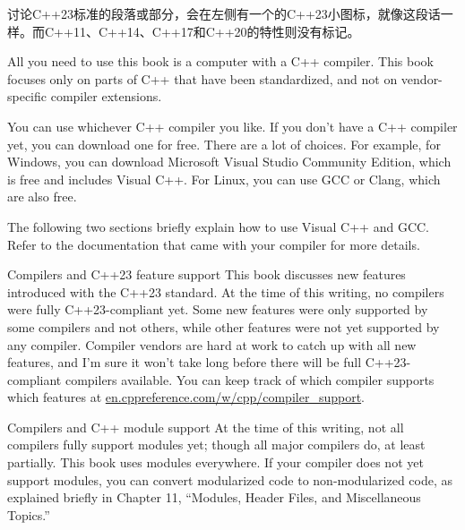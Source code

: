

讨论C++23标准的段落或部分，会在左侧有一个的C++23小图标，就像这段话一样。而C++11、C++14、C++17和C++20的特性则没有标记。



All you need to use this book is a computer with a C++ compiler. This book focuses only on parts of C++ that have been standardized, and not on vendor-specific compiler extensions.


You can use whichever C++ compiler you like. If you don’t have a C++ compiler yet, you can download one for free. There are a lot of choices. For example, for Windows, you can download Microsoft Visual Studio Community Edition, which is free and includes Visual C++. For Linux, you can use GCC or Clang, which are also free.

The following two sections briefly explain how to use Visual C++ and GCC. Refer to the documentation that came with your compiler for more details.

\begin{myTip}{Compilers and C++23 feature support}
This book discusses new features introduced with the C++23 standard. At the time of this writing, no compilers were fully C++23-compliant yet. Some new features were only supported by some compilers and not others, while other features were not yet supported by any compiler. Compiler vendors are hard at work to catch up with all new features, and I’m sure it won’t take long before there will be full C++23-compliant compilers available. You can keep track of which compiler supports which features at \url{en.cppreference.com/w/cpp/compiler_support}.
\end{myTip}

\begin{myTip}{Compilers and C++ module support}
At the time of this writing, not all compilers fully support modules yet; though all major compilers do, at least partially. This book uses modules everywhere. If your compiler does not yet support modules, you can convert modularized code to non-modularized code, as explained briefly in Chapter 11, “Modules, Header Files, and Miscellaneous Topics.”
\end{myTip}


